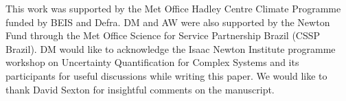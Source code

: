 \documentclass[gmd, manuscript]{copernicus}
\begin{document}
\appendixtables   %




\begin{acknowledgements}
This work was supported by the Met Office Hadley Centre Climate Programme funded by BEIS and Defra. DM and AW were also supported by the Newton Fund through the Met Office Science for Service Partnership Brazil (CSSP Brazil). DM would like to acknowledge the Isaac Newton Institute programme workshop on Uncertainty Quantification for Complex Systems and its participants for useful discussions while writing this paper. We would like to thank David Sexton for insightful comments on the manuscript.
\end{acknowledgements}






%
%
%





\end{document}
